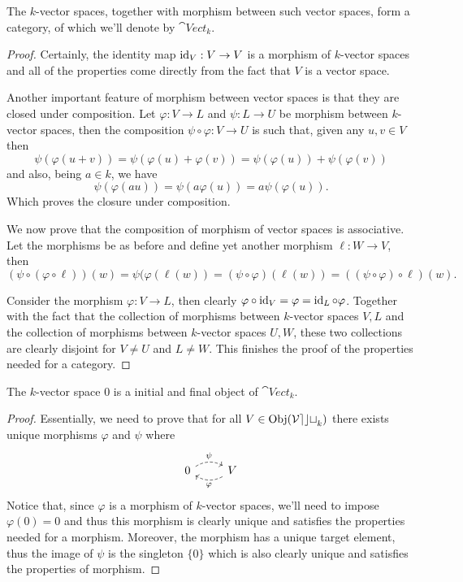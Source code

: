 \begin{proposition}\label{prop: category of vector spaces}
   The \(k\)-vector spaces, together with morphism between such vector spaces,
   form a category, of which we'll denote by \(\cat{Vect}_k\).
\end{proposition}

\begin{proof}
   Certainly, the identity map \(\operatorname{id}_V : V \to V\) is a morphism of \(k\)-vector
   spaces and all of the properties come directly from the fact that \(V\) is a
   vector space.

   Another important feature of morphism between vector spaces is that they are
   closed under composition. Let \(\varphi : V \to L\) and \(\psi : L \to U\) be
   morphism between \(k\)-vector spaces, then the composition \(\psi \circ
   \varphi : V \to U\) is such that, given any \(u, v \in V\) then 
   \[ 
      \psi(\varphi(u+v)) = \psi(\varphi(u) + \varphi(v)) = \psi(\varphi(u)) +
      \psi(\varphi(v))
   \]
   and also, being \(a \in k\), we have
   \[
      \psi(\varphi(au)) = \psi(a\varphi(u)) = a \psi(\varphi(u)).
   \] 
   Which proves the closure under composition.

   We now prove that the composition of morphism of vector spaces is
   associative. Let the morphisms be as before and define yet another morphism
   \(\ell : W \to V\), then
   \[
      (\psi \circ (\varphi \circ \ell)) (w) = \psi(\varphi(\ell(w)) = (\psi \circ
      \varphi)(\ell(w)) = ((\psi \circ \varphi) \circ \ell) (w).
   \] 

   Consider the morphism \(\varphi : V \to L\), then clearly \(\varphi \circ
   \operatorname{id}_V = \varphi = \operatorname{id}_L \circ \varphi\). Together with the fact that the
   collection of morphisms between \(k\)-vector spaces \(V, L\) and the
   collection of morphisms between \(k\)-vector spaces \(U, W\), these two
   collections are clearly disjoint for \(V \neq U\) and \(L \neq W\). This
   finishes the proof of the properties needed for a category. 
\end{proof}

\begin{proposition}
   The \(k \)-vector space \(0\) is a initial and final object of
   \(\cat{Vect}_k\).
\end{proposition}

\begin{proof}
   Essentially, we need to prove that for all \(V \in \operatorname{Obj}(\mathcal{Vect}_k)\) there
   exists unique morphisms \(\varphi\) and \(\psi\) where
   \[
     \begin{tikzcd}
       0
       \ar[r, bend left, dashed, "\psi"]
         &V
         \ar[l, bend left, dashed, "\varphi"]
     \end{tikzcd}
   \] 
   Notice that, since \(\varphi\) is a morphism of \(k\)-vector spaces, we'll
   need to impose \(\varphi(0) = 0\) and thus this morphism is clearly unique
   and satisfies the properties needed for a morphism. Moreover, the morphism
   has a unique target element, thus the image of \(\psi\) is the singleton
   \(\{0\}\) which is also clearly unique and satisfies the properties of
   morphism. 
\end{proof}

